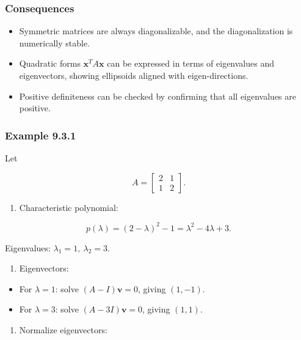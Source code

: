 \documentclass[
  12pt,
  a4paper,
]{article}
\begin{document}
\subsubsection{Consequences}\label{consequences}

\begin{itemize}
\item
  Symmetric matrices are always diagonalizable, and the diagonalization
  is numerically stable.
\item
  Quadratic forms \(\mathbf{x}^T A \mathbf{x}\) can be expressed in
  terms of eigenvalues and eigenvectors, showing ellipsoids aligned with
  eigen-directions.
\item
  Positive definiteness can be checked by confirming that all
  eigenvalues are positive.
\end{itemize}

\subsubsection{Example 9.3.1}\label{example-931}

Let

\[A = \begin{bmatrix} 2 & 1 \\ 1 & 2 \end{bmatrix}.\]

\begin{enumerate}
\def\labelenumi{\arabic{enumi}.}
\item
  Characteristic polynomial:
\end{enumerate}

\[p(\lambda) = (2-\lambda)^2 - 1 = \lambda^2 - 4\lambda + 3.\]

Eigenvalues: \(\lambda_1 = 1, \ \lambda_2 = 3\).

\begin{enumerate}
\def\labelenumi{\arabic{enumi}.}
\item
  Eigenvectors:
\end{enumerate}

\begin{itemize}
\item
  For \(\lambda=1\): solve \((A-I)\mathbf{v} = 0\), giving \((1,-1)\).
\item
  For \(\lambda=3\): solve \((A-3I)\mathbf{v} = 0\), giving \((1,1)\).
\end{itemize}

\begin{enumerate}
\def\labelenumi{\arabic{enumi}.}
\item
  Normalize eigenvectors:
\end{enumerate}
\end{document}
